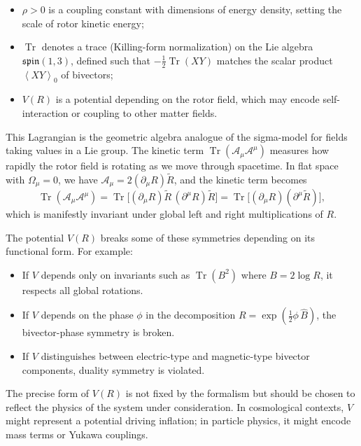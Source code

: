\documentclass[11pt,a4paper]{article}
\numberwithin{equation}{section}
\theoremstyle{plain}
\theoremstyle{definition}
\theoremstyle{remark}
\DeclareMathOperator{\Tr}{Tr}
\newcommand{\ang}[1]{\left\langle #1 \right\rangle}
\begin{document}
\begin{itemize}
  \item $\rho>0$ is a coupling constant with dimensions of energy density, setting the scale of rotor kinetic energy;
  \item $\Tr$ denotes a trace (Killing-form normalization) on the Lie algebra $\mathfrak{spin}(1,3)$, defined such that $-\tfrac{1}{2}\Tr(XY)$ matches the scalar product $\ang{XY}_0$ of bivectors;
  \item $V(R)$ is a potential depending on the rotor field, which may encode self-interaction or coupling to other matter fields.
\end{itemize}

This Lagrangian is the geometric algebra analogue of the sigma-model for fields taking values in a Lie group. The kinetic term $\Tr(\mathcal{A}_\mu\mathcal{A}^\mu)$ measures how rapidly the rotor field is rotating as we move through spacetime. In flat space with $\Omega_\mu=0$, we have $\mathcal{A}_\mu = 2(\partial_\mu R)\widetilde{R}$, and the kinetic term becomes
\begin{equation}
\Tr(\mathcal{A}_\mu\mathcal{A}^\mu) = \Tr\big[(\partial_\mu R)\widetilde{R}\,(\partial^\mu R)\widetilde{R}\big] = \Tr\big[(\partial_\mu R)(\partial^\mu \widetilde{R})\big],
\end{equation}
which is manifestly invariant under global left and right multiplications of $R$.

The potential $V(R)$ breaks some of these symmetries depending on its functional form. For example:

\begin{itemize}
  \item If $V$ depends only on invariants such as $\Tr(B^2)$ where $B=2\log R$, it respects all global rotations.
  \item If $V$ depends on the phase $\phi$ in the decomposition $R=\exp(\frac{1}{2}\phi\,\hat{B})$, the bivector-phase symmetry is broken.
  \item If $V$ distinguishes between electric-type and magnetic-type bivector components, duality symmetry is violated.
\end{itemize}

The precise form of $V(R)$ is not fixed by the formalism but should be chosen to reflect the physics of the system under consideration. In cosmological contexts, $V$ might represent a potential driving inflation; in particle physics, it might encode mass terms or Yukawa couplings.
\end{document}
